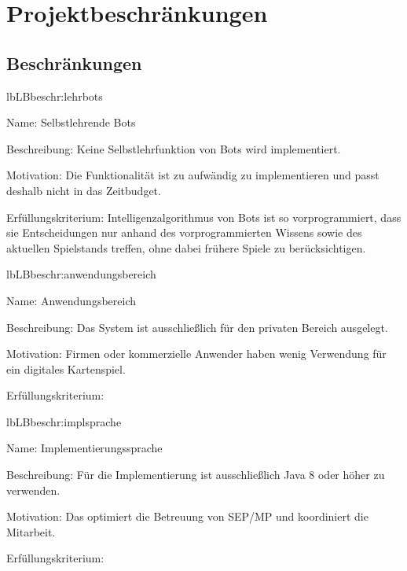 \chapter{Projektbeschränkungen}

\section{Beschränkungen}

\setcounter{lb}{10}

\begin{description}[leftmargin=5em, style=sameline]
	
	\begin{lhp}{lb}{LB}{beschr:lehrbots}
		\item [Name:] Selbstlehrende Bots
		\item [Beschreibung:] Keine Selbstlehrfunktion von Bots wird implementiert.
		\item [Motivation:] Die Funktionalität ist zu aufwändig zu implementieren und passt deshalb nicht in das Zeitbudget.
		\item [Erfüllungskriterium:] Intelligenzalgorithmus von Bots ist so vorprogrammiert, dass sie Entscheidungen nur anhand des vorprogrammierten Wissens sowie des aktuellen Spielstands treffen, ohne dabei frühere Spiele zu berücksichtigen.
	\end{lhp}
	
	\begin{lhp}{lb}{LB}{beschr:anwendungsbereich}
		\item [Name:] Anwendungsbereich
		\item [Beschreibung:] Das System ist ausschließlich für den privaten Bereich ausgelegt.
		\item [Motivation:] Firmen oder kommerzielle Anwender haben wenig Verwendung für ein digitales Kartenspiel. 
		\item [Erfüllungskriterium:] 
	\end{lhp}
	
		
	\begin{lhp}{lb}{LB}{beschr:implsprache}
		\item [Name:] Implementierungssprache
		\item [Beschreibung:] Für die Implementierung ist ausschließlich Java 8 oder höher zu verwenden.
		\item [Motivation:] Das optimiert die Betreuung von SEP/MP und koordiniert die Mitarbeit.
		\item [Erfüllungskriterium:] 
	\end{lhp}
	

\end{description}
